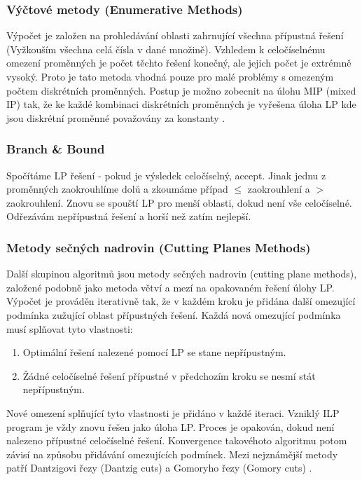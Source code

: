 \subsubsection{Výčtové metody (Enumerative Methods)}
Výpočet je založen na prohledávání oblasti zahrnující všechna přípustná řešení (Vyžkouším všechna celá čísla v dané množině). Vzhledem k celočíselnému omezení proměnných je počet těchto řešení konečný, ale jejich počet je extrémně vysoký. Proto je tato metoda vhodná pouze pro malé problémy s omezeným počtem diskrétních proměnných. Postup je možno zobecnit na úlohu MIP (mixed IP) tak, že ke každé kombinaci diskrétních proměnných je vyřešena úloha LP kde jsou diskrétní proměnné považovány za konstanty \cite{ko:ilp-sucha}.

\subsubsection{Branch \& Bound}
Spočítáme LP řešení - pokud je výsledek celočíselný, accept. Jinak jednu z proměnných zaokrouhlíme dolů a zkoumáme případ $\leq$ zaokrouhlení a $>$ zaokrouhlení. Znovu se spouští LP pro menší oblasti, dokud není vše celočíselné. Odřezávám nepřípustná řešení a horší než zatím nejlepší.

\subsubsection{Metody sečných nadrovin (Cutting Planes Methods)}
Další skupinou algoritmů jsou metody sečných nadrovin (cutting plane methods), založené podobně jako metoda větví a mezí na opakovaném řešení úlohy LP. Výpočet je prováděn iterativně tak, že v každém kroku je přidána další omezující podmínka zužující oblast přípustných řešení. Každá nová omezující podmínka musí splňovat tyto vlastnosti:

\begin{enumerate}
	\item Optimální řešení nalezené pomocí LP se stane nepřípustným.
	\item Žádné celočíselné řešení přípustné v předchozím kroku se nesmí stát nepřípustným. 
\end{enumerate}

Nové omezení splňující tyto vlastnosti je přidáno v každé iteraci. Vzniklý ILP program je vždy znovu řešen jako úloha LP. Proces je opakován, dokud není nalezeno přípustné celočíselné řešení. Konvergence takovéhoto algoritmu potom závisí na způsobu přidávání omezujících podmínek. Mezi nejznámější metody patří Dantzigovi řezy (Dantzig cuts) a Gomoryho řezy (Gomory cuts) \cite{ko:ilp-sucha}.

